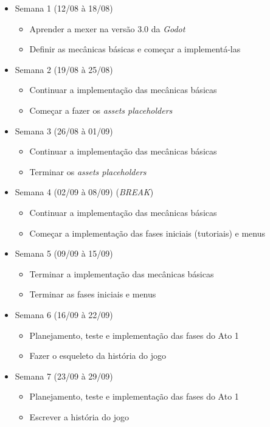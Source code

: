 \documentclass[a4paper, 11pt]{article}
\begin{document}
\begin{itemize} 
\item Semana 1 (12/08 à 18/08)
 \begin{itemize} 
 \item Aprender a mexer na versão 3.0 da \textit{Godot}
 \item Definir as mecânicas básicas e começar a implementá-las
  \end{itemize}

\item Semana 2 (19/08 à 25/08)
 \begin{itemize} 
 \item Continuar a implementação das mecânicas básicas
 \item Começar a fazer os \textit{assets placeholders}
 \end{itemize}

\item Semana 3 (26/08 à 01/09)
 \begin{itemize} 
 \item Continuar a implementação das mecânicas básicas
 \item Terminar os \textit{assets placeholders}
 \end{itemize}

\item Semana 4 (02/09 à 08/09) (\textit{BREAK})
 \begin{itemize} 
 \item Continuar a implementação das mecânicas básicas
 \item Começar a implementação das fases iniciais (tutoriais) e menus
 \end{itemize}

\item Semana 5 (09/09 à 15/09)
 \begin{itemize} 
 \item Terminar a implementação das mecânicas básicas
 \item Terminar as fases iniciais e menus
 \end{itemize}

\item Semana 6 (16/09 à 22/09)
 \begin{itemize} 
 \item Planejamento, teste e implementação das fases do Ato 1
 \item Fazer o esqueleto da história do jogo
 \end{itemize}

\item Semana 7 (23/09 à 29/09)
 \begin{itemize} 
 \item Planejamento, teste e implementação das fases do Ato 1
 \item Escrever a história do jogo
 \end{itemize}


\end{itemize}
\end{document}

